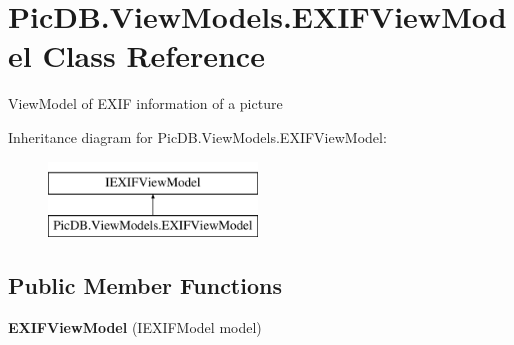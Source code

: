 \hypertarget{class_pic_d_b_1_1_view_models_1_1_e_x_i_f_view_model}{}\section{Pic\+D\+B.\+View\+Models.\+E\+X\+I\+F\+View\+Model Class Reference}
\label{class_pic_d_b_1_1_view_models_1_1_e_x_i_f_view_model}


View\+Model of E\+X\+IF information of a picture  


Inheritance diagram for Pic\+D\+B.\+View\+Models.\+E\+X\+I\+F\+View\+Model\+:\begin{figure}[H]
\begin{center}
\leavevmode
\includegraphics[height=2.000000cm]{class_pic_d_b_1_1_view_models_1_1_e_x_i_f_view_model}
\end{center}
\end{figure}
\subsection*{Public Member Functions}
\begin{DoxyCompactItemize}
\item 
\mbox{\label{class_pic_d_b_1_1_view_models_1_1_e_x_i_f_view_model_afe92988a8d719b82f8f0e8bda57d6b02}} 
{\bfseries E\+X\+I\+F\+View\+Model} (I\+E\+X\+I\+F\+Model model)
\end{DoxyCompactItemize}
